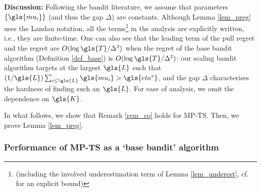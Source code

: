 \textbf{Discussion:} Following the bandit literature, we assume that parameters $\{\gls{mu_i}\}$ (and thus the gap $\Delta$) are constants. Although Lemma \ref{lem_preg} uses the Landau notation, all the terms\footnote{(including the involved underestimation term of Lemma \ref{lem_underest}, cf. \cite{DBLP:conf/alt/Maillard17} for an explicit bound)} in the analysis are explicitly written, i.e., they are finite-time. 
One can also see that the leading term of the pull regret and the regret are $O(\log {\gls{T}}/\Delta^2)$ when the regret of the base bandit algorithm (Definition \ref{def_base}) is $O(\log {\gls{T}}/\Delta^2)$: our scaling bandit algorithm targets at the largest $\gls{L}$ such that $(1/\gls{L})\sum_{i\le \gls{L}} \gls{mu_i} > \gls{eta^*}$, and the gap $\Delta$ characterises the hardness of finding such an $\gls{L}$. 
For ease of analysis, we omit the dependence on $\gls{K}$. 

In what follows, we show that Remark \ref{rem_co} holds for \gls{MP-TS}. Then, we prove Lemma \ref{lem_preg}. 

\subsubsection{Performance of \gls{MP-TS} as a `base bandit' algorithm}
\label{subsec_rem_mpts}

